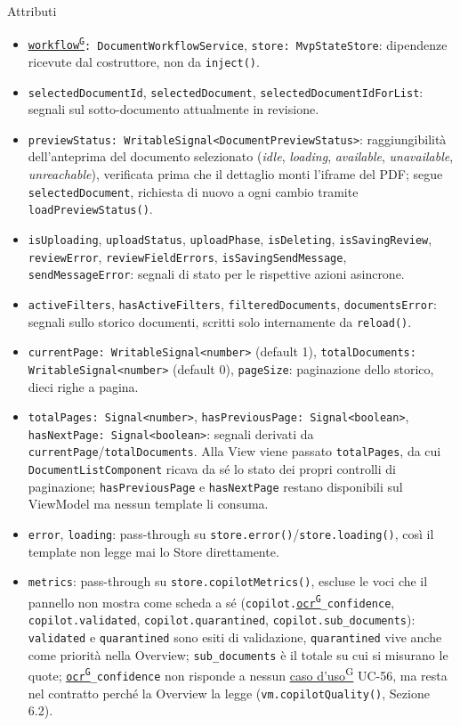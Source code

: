 \documentclass[a4paper,12pt]{article}
\providecommand{\glslink}[2]{\href{https://alittlebyte-19.github.io/Documentazione/glossario.html\#gls-#1}{\underline{#2}\textsuperscript{\scriptsize G}}}
\begin{document}
\begin{sloppypar}
Attributi
\begin{itemize}\raggedright
    \item \texttt{\glslink{workflow}{workflow}: DocumentWorkflowService}, \texttt{store: MvpStateStore}: dipendenze ricevute dal costruttore, non da \texttt{inject()}.
    \item \texttt{selectedDocumentId}, \texttt{selectedDocument}, \texttt{selectedDocumentIdForList}: segnali sul sotto-documento attualmente in revisione.
    \item \texttt{previewStatus: WritableSignal<DocumentPreviewStatus>}: raggiungibilità dell'anteprima del documento selezionato (\textit{idle}, \textit{loading}, \textit{available}, \textit{unavailable}, \textit{unreachable}), verificata prima che il dettaglio monti l'iframe del PDF; segue \texttt{selectedDocument}, richiesta di nuovo a ogni cambio tramite \texttt{loadPreviewStatus()}.
    \item \texttt{isUploading}, \texttt{uploadStatus}, \texttt{uploadPhase}, \texttt{isDeleting}, \texttt{isSavingReview}, \texttt{reviewError}, \texttt{reviewFieldErrors}, \texttt{isSavingSendMessage}, \texttt{sendMessageError}: segnali di stato per le rispettive azioni asincrone.
    \item \texttt{activeFilters}, \texttt{hasActiveFilters}, \texttt{filteredDocuments}, \texttt{documentsError}: segnali sullo storico documenti, scritti solo internamente da \texttt{reload()}.
    \item \texttt{currentPage: WritableSignal<number>} (default 1), \texttt{totalDocuments: WritableSignal<number>} (default 0), \texttt{pageSize}: paginazione dello storico, dieci righe a pagina.
    \item \texttt{totalPages: Signal<number>}, \texttt{hasPreviousPage: Signal<boolean>}, \texttt{hasNextPage: Signal<boolean>}: segnali derivati da \texttt{currentPage}/\texttt{totalDocuments}. Alla View viene passato \texttt{totalPages}, da cui \texttt{DocumentListComponent} ricava da sé lo stato dei propri controlli di paginazione; \texttt{hasPreviousPage} e \texttt{hasNextPage} restano disponibili sul ViewModel ma nessun template li consuma.
    \item \texttt{error}, \texttt{loading}: pass-through su \texttt{store.error()}/\texttt{store.loading()}, così il template non legge mai lo Store direttamente.
    \item \texttt{metrics}: pass-through su \texttt{store.copilotMetrics()}, escluse le voci che il pannello non mostra come scheda a sé (\texttt{copilot.\glslink{ocr-riconoscimento-ottico-dei-caratteri}{ocr}\_confidence}, \texttt{copilot.validated}, \texttt{copilot.quarantined}, \texttt{copilot.sub\_documents}): \texttt{validated} e \texttt{quarantined} sono esiti di validazione, \texttt{quarantined} vive anche come priorità nella Overview; \texttt{sub\_documents} è il totale su cui si misurano le quote; \texttt{\glslink{ocr-riconoscimento-ottico-dei-caratteri}{ocr}\_confidence} non risponde a nessun \glslink{caso-d-uso-uc}{caso d'uso} UC-56, ma resta nel contratto perché la Overview la legge (\texttt{vm.copilotQuality()}, Sezione 6.2).

\end{itemize}
\end{sloppypar}
\end{document}
